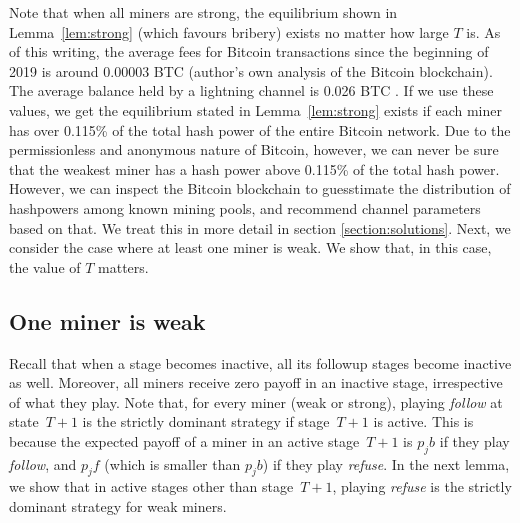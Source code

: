 \documentclass[runningheads]{llncs}
\newcommand{\refuse}{\emph{refuse}}
\newcommand{\follow}{\emph{follow}}
\begin{document}
Note that when all miners are strong, the equilibrium shown in Lemma~\ref{lem:strong} (which favours bribery) exists no matter how large $T$ is. As of this writing, the average fees for Bitcoin transactions since the beginning of 2019 is around 0.00003 BTC (author's own analysis of the Bitcoin blockchain). The average balance held by a lightning channel is 0.026 BTC \cite{1ml}. If we use these values, we get the equilibrium stated in Lemma~\ref{lem:strong} exists if each miner has over 0.115\% of the total hash power of the entire Bitcoin network. Due to the permissionless and anonymous nature of Bitcoin, however, we can never be sure that the weakest miner has a hash power above 0.115\% of the total hash power. However, we can inspect the Bitcoin blockchain to guesstimate the distribution of hashpowers among known mining pools, and recommend channel parameters based on that. We treat this in more detail in section \ref{section:solutions}. Next, we consider the case where at least one miner is weak. We show that, in this case, the value of $T$ matters.

\subsection{One miner is weak} \label{ss:one_miner_weak} 
Recall that when a stage becomes inactive, all its followup stages become inactive as well. Moreover, all miners receive zero payoff in an inactive stage, irrespective of what they play. Note that, for every miner (weak or strong), playing \follow{} at state~$T+1$ is the strictly dominant strategy if stage~$T+1$ is active. This is because the expected payoff of a miner in an active stage~$T+1$ is $p_jb$ if they play \follow{}, and $p_jf$ (which is smaller than $p_jb$) if they play \refuse{}.
In the next lemma, we show that in active stages other than stage~$T+1$, playing \refuse{} is the strictly dominant strategy for weak miners.
\end{document}
